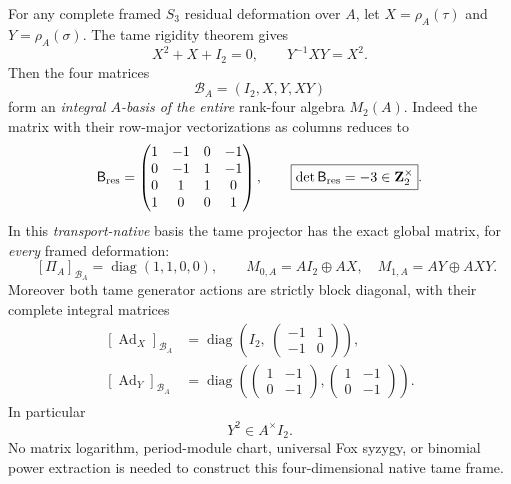 \begin{theorem}
\label{thm:dyadic-f131-native-tame-four-frame}
For any complete framed
$S_3$ residual deformation
over $A$, let
$X=\rho_A(\tau)$ and
$Y=\rho_A(\sigma)$.
The tame rigidity theorem
gives
\[
X^2+X+I_2=0,
\qquad Y^{-1}XY=X^2.
\]
Then the four matrices
\begin{equation}\label{eq:dyadic-f131-universal-native-frame}
\boxed{\qquad
\mathcal B_A=(I_2,X,Y,XY)
\qquad}
\end{equation}
form an \emph{integral
$A$-basis of the entire}
rank-four algebra
$M_2(A)$.
Indeed the matrix with
their row-major vectorizations
as columns reduces to
\begin{equation}\label{eq:dyadic-f131-native-frame-residue}
\mathsf B_{\rm res}=
\begin{pmatrix}
1&-1&0&-1\\
0&-1&1&-1\\
0&1&1&0\\
1&0&0&1
\end{pmatrix},
\qquad
\boxed{\det\mathsf B_{\rm res}=-3
\in\mathbf Z_2^\times}.
\end{equation}
In this \emph{transport-native}
basis the tame projector
has the exact global
matrix, for \emph{every}
framed deformation:
\begin{equation}\label{eq:dyadic-f131-universal-diagonal-projector}
\boxed{\qquad
[\Pi_A]_{\mathcal B_A}
=\operatorname{diag}(1,1,0,0),
\qquad
M_{0,A}=A I_2\oplus AX,
\quad
M_{1,A}=AY\oplus AXY.
\qquad}
\end{equation}
Moreover both tame
generator actions are
strictly block diagonal,
with their complete
integral matrices
\begin{equation}\label{eq:dyadic-f131-universal-block-actions}
\boxed{
\begin{aligned}
[\operatorname{Ad}_X]_{\mathcal B_A}
&=
\operatorname{diag}\left(
 I_2,\
 \begin{pmatrix}-1&1\\-1&0\end{pmatrix}
 \right),\\[2pt]
[\operatorname{Ad}_Y]_{\mathcal B_A}
&=
\operatorname{diag}\left(
 \begin{pmatrix}1&-1\\0&-1\end{pmatrix},
 \begin{pmatrix}1&-1\\0&-1\end{pmatrix}
 \right).
\end{aligned}}
\end{equation}
In particular
\begin{equation}\label{eq:dyadic-f131-frobenius-square-scalar}
\boxed{\qquad Y^2\in A^\times I_2. \qquad}
\end{equation}
No matrix logarithm,
period-module chart,
universal Fox syzygy,
or binomial power
extraction is needed
to construct this
four-dimensional
native tame frame.


\end{theorem}
